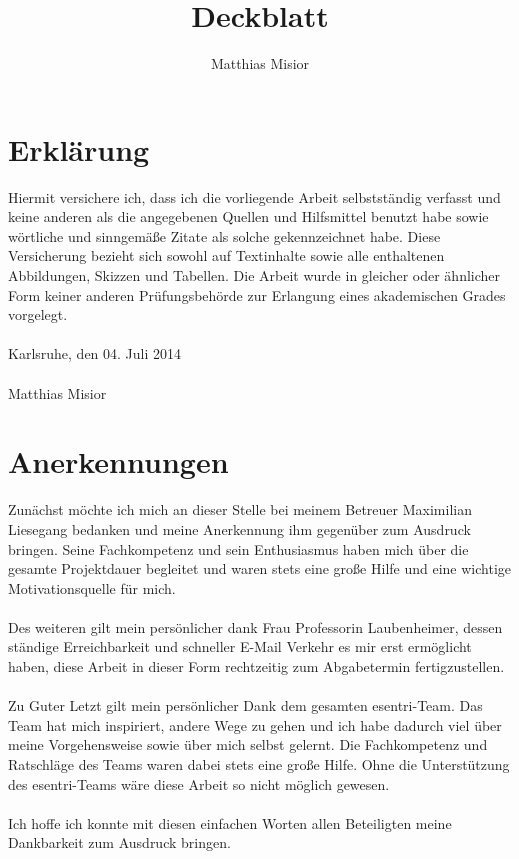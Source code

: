 \documentclass[a4paper,12pt]{scrartcl}
\title{Deckblatt}
\author{Matthias Misior}
\begin{document}
\thispagestyle{empty}
\section*{Erklärung}
Hiermit versichere ich, dass ich die vorliegende Arbeit selbstständig verfasst und keine anderen als die angegebenen Quellen und Hilfsmittel benutzt habe sowie wörtliche und sinngemäße Zitate als solche gekennzeichnet habe. Diese Versicherung bezieht sich sowohl auf
Textinhalte sowie alle enthaltenen Abbildungen, Skizzen und Tabellen. Die Arbeit wurde in gleicher oder ähnlicher Form keiner anderen Prüfungsbehörde zur Erlangung eines akademischen Grades vorgelegt.
\\\\
Karlsruhe, den 04. Juli 2014
\\\\
Matthias Misior \noindent\dotfill

\newpage
\thispagestyle{empty}
\section*{Anerkennungen}
Zunächst möchte ich mich an dieser Stelle bei meinem Betreuer Maximilian Liesegang bedanken und meine Anerkennung ihm gegenüber zum Ausdruck bringen. Seine Fachkompetenz und sein Enthusiasmus haben mich über die gesamte Projektdauer begleitet und waren stets eine große Hilfe und eine wichtige Motivationsquelle für mich. 
\\\\
Des weiteren gilt mein persönlicher dank Frau Professorin Laubenheimer, dessen ständige Erreichbarkeit und schneller E-Mail Verkehr es mir erst ermöglicht haben, diese Arbeit in dieser Form rechtzeitig zum Abgabetermin fertigzustellen. 
\\\\
Zu Guter Letzt gilt mein persönlicher Dank dem gesamten esentri-Team. Das Team hat mich inspiriert, andere Wege zu gehen und ich habe dadurch viel über meine Vorgehensweise sowie über mich selbst gelernt. Die Fachkompetenz und Ratschläge des Teams waren dabei stets eine große Hilfe. Ohne die Unterstützung des esentri-Teams wäre diese Arbeit so nicht möglich gewesen.
\\\\
Ich hoffe ich konnte mit diesen einfachen Worten allen Beteiligten meine Dankbarkeit zum Ausdruck bringen. 

\newpage
\thispagestyle{empty}
\end{document}
